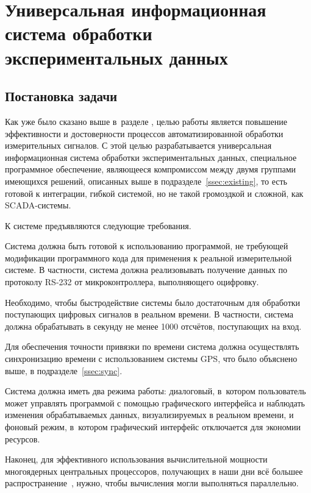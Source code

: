 \documentclass[a4paper, 14pt, titlepage]{extarticle}
\let\oldsection\section
\renewcommand{\section}{\newpage\oldsection}
\begin{document}
  \section{Универсальная информационная система обработки экспериментальных данных}

  \subsection{Постановка задачи}\label{ssec:task}

  Как уже было сказано выше в~разделе ,
  целью работы является повышение эффективности и достоверности процессов автоматизированной
  обработки измерительных сигналов. С этой целью разрабатывается универсальная информационная
  система обработки экспериментальных данных,
  специальное программное обеспечение,
  являющееся компромиссом между двумя группами имеющихся решений, описанных выше в
  подразделе~\ref{ssec:existing}, то есть готовой к интеграции, гибкой системой, но не такой
  громоздкой и сложной, как SCADA-системы.

  К системе предъявляются следующие требования.

  Система должна быть готовой к использованию программой, не требующей модификации программного кода
  для применения к реальной измерительной системе. В частности, система должна реализовывать
  получение данных по протоколу RS-232\cite{sweet-serial} от микроконтроллера, выполняющего оцифровку.

  Необходимо, чтобы быстродействие системы было достаточным для обработки поступающих цифровых
  сигналов в реальном времени. В частности, система должна обрабатывать в секунду не менее 1000
  отсчётов, поступающих на вход.

  Для обеспечения точности привязки по времени система должна осуществлять синхронизацию времени с
  использованием системы GPS, что было объяснено выше, в подразделе~\ref{ssec:sync}.

  Система должна иметь два режима работы: диалоговый, в~котором пользователь может управлять
  программой с помощью графического интерфейса и наблюдать изменения обрабатываемых данных,
  визуализируемых в реальном времени, и фоновый режим, в~котором графический интерфейс отключается
  для экономии ресурсов.

  Наконец, для эффективного использования вычислительной мощности многоядерных центральных
  процессоров, получающих в наши дни всё большее распространение~\cite{steam-hardware}, нужно, чтобы
  вычисления могли выполняться параллельно.
\end{document}

